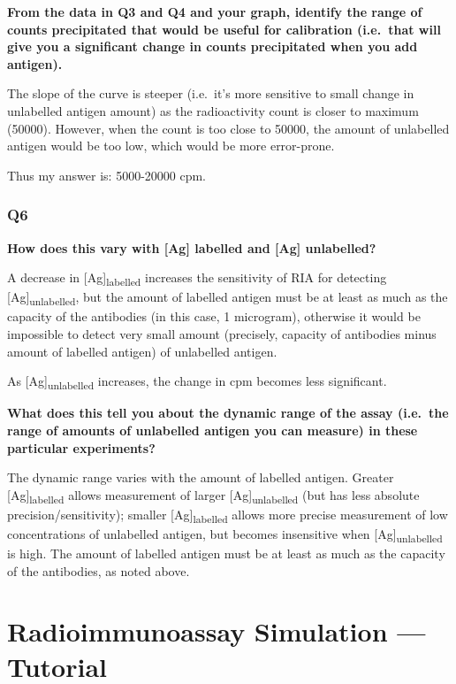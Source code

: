 \documentclass[
]{article}
\begin{document}
\textbf{From the data in Q3 and Q4 and your graph, identify the range of counts precipitated that would be useful for calibration (i.e.~that will give you a significant change in counts precipitated when you add antigen).}

The slope of the curve is steeper (i.e.~it's more sensitive to small change in unlabelled antigen amount) as the radioactivity count is closer to maximum (50000). However, when the count is too close to 50000, the amount of unlabelled antigen would be too low, which would be more error-prone.

Thus my answer is: 5000-20000 cpm.

\hypertarget{q6}{%
\subsubsection*{Q6}\label{q6}}

\textbf{How does this vary with {[}Ag{]} labelled and {[}Ag{]} unlabelled?}

A decrease in {[}Ag{]}\textsubscript{labelled} increases the sensitivity of RIA for detecting {[}Ag{]}\textsubscript{unlabelled}, but the amount of labelled antigen must be at least as much as the capacity of the antibodies (in this case, 1 microgram), otherwise it would be impossible to detect very small amount (precisely, capacity of antibodies minus amount of labelled antigen) of unlabelled antigen.

As {[}Ag{]}\textsubscript{unlabelled} increases, the change in cpm becomes less significant.

\textbf{What does this tell you about the dynamic range of the assay (i.e.~the range of amounts of unlabelled antigen you can measure) in these particular experiments?}

The dynamic range varies with the amount of labelled antigen. Greater {[}Ag{]}\textsubscript{labelled} allows measurement of larger {[}Ag{]}\textsubscript{unlabelled} (but has less absolute precision/sensitivity); smaller {[}Ag{]}\textsubscript{labelled} allows more precise measurement of low concentrations of unlabelled antigen, but becomes insensitive when {[}Ag{]}\textsubscript{unlabelled} is high. The amount of labelled antigen must be at least as much as the capacity of the antibodies, as noted above.

\hypertarget{radioimmunoassay-simulation-tutorial}{%
\section{Radioimmunoassay Simulation --- Tutorial}\label{radioimmunoassay-simulation-tutorial}}
\end{document}
